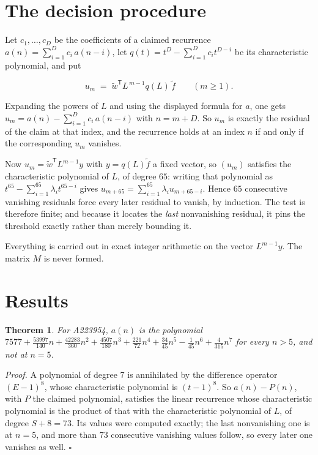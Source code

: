 \documentclass[11pt]{article}
\newtheorem{theorem}{Theorem}
\theoremstyle{definition}
\begin{document}
\section{The decision procedure}

Let $c_1,\dots,c_D$ be the coefficients of a claimed recurrence $a(n) = \sum_{i=1}^{D} c_i\,a(n-i)$, let $q(t) = t^{D} - \sum_{i=1}^{D} c_i t^{D-i}$ be its characteristic polynomial, and put

\[u_m \;=\; \tilde w^{\mathsf T} L^{\,m-1} q(L)\,\tilde f \qquad (m \ge 1).\]

Expanding the powers of $L$ and using the displayed formula for $a$, one gets $u_m = a(n) - \sum_{i=1}^{D} c_i\,a(n-i)$ with $n = m + D$. So $u_m$ is exactly the residual of the claim at that index, and the recurrence holds at an index $n$ if and only if the corresponding $u_m$ vanishes.

Now $u_m = \tilde w^{\mathsf T} L^{m-1} y$ with $y = q(L)\tilde f$ a fixed vector, so $(u_m)$ satisfies the characteristic polynomial of $L$, of degree $65$: writing that polynomial as $t^{65} - \sum_{i=1}^{65} \lambda_i t^{65-i}$ gives $u_{m+65} = \sum_{i=1}^{65} \lambda_i u_{m+65-i}$. Hence $65$ consecutive vanishing residuals force every later residual to vanish, by induction. The test is therefore finite; and because it locates the {\itshape last} nonvanishing residual, it pins the threshold exactly rather than merely bounding it.

Everything is carried out in exact integer arithmetic on the vector $L^{m-1}y$. The matrix $M$ is never formed.

\section{Results}

\begin{theorem} For A223954, $a(n)$ is the polynomial $7577 + \frac{53997}{140}n + \frac{42283}{360}n^{2} + \frac{4507}{180}n^{3} + \frac{221}{72}n^{4} + \frac{34}{45}n^{5} - \frac{1}{45}n^{6} + \frac{4}{315}n^{7}$ for every $n > 5$, and not at $n = 5$.\end{theorem}

{\itshape Proof.} A polynomial of degree $7$ is annihilated by the difference operator $(E-1)^{8}$, whose characteristic polynomial is $(t-1)^{8}$. So $a(n) - P(n)$, with $P$ the claimed polynomial, satisfies the linear recurrence whose characteristic polynomial is the product of that with the characteristic polynomial of $L$, of degree $S + 8 = 73$. Its values were computed exactly; the last nonvanishing one is at $n = 5$, and more than $73$ consecutive vanishing values follow, so every later one vanishes as well. $\square$
\end{document}
